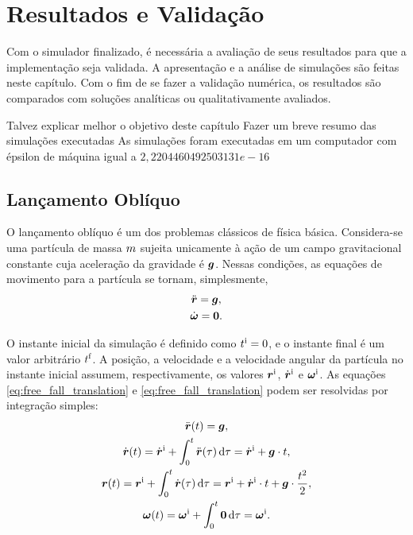 \chapter{Resultados e Validação} \label{ch:results}

Com o simulador finalizado, é necessária a avaliação de seus resultados para que a implementação seja validada. A apresentação e a análise de simulações são feitas neste capítulo. Com o fim de se fazer a validação numérica, os resultados são comparados com soluções analíticas ou qualitativamente avaliados.

\alert{Talvez explicar melhor o objetivo deste capítulo}
\alert{Fazer um breve resumo das simulações executadas}
\alert{As simulações foram executadas em um computador com épsilon de máquina igual a \(2,2204460492503131e-16\)}

\section{Lançamento Oblíquo}

O lançamento oblíquo é um dos problemas clássicos de física básica. Considera-se uma partícula de massa \(m\) sujeita unicamente à ação de um campo gravitacional constante cuja aceleração da gravidade é \(\bm{g}\). Nessas condições, as equações de movimento para a partícula se tornam, simplesmente,
\begin{gather}
	\acceleration = \gravity, \label{eq:free_fall_translation}\\
	\angularAcceleration = \nullVector \label{eq:free_fall_rotation}.
\end{gather}

O instante inicial da simulação é definido como \(t^{\text{i}}=0\), e o instante final é um valor arbitrário \(t^{\text{f}}\). A posição, a velocidade e a velocidade angular da partícula no instante inicial assumem, respectivamente, os valores \(\bm{r}^{\text{i}}\), \(\initial{\velocity}\) e \(\bm{\omega}^{\text{i}}\). As equações \eqref{eq:free_fall_translation} e \eqref{eq:free_fall_translation} podem ser resolvidas por integração simples:
\begin{gather*}
	\acceleration\pqty{t} = \gravity, \\
	\velocity\pqty{t} = \initial{\velocity} + \int_{0}^{t} \acceleration\pqty{\tau} \dd{\tau} = \initial{\velocity} + \gravity\cdot t, \\
	\position\pqty{t} = \initial{\position} + \int_{0}^{t} \velocity\pqty{\tau} \dd{\tau} = \initial{\position} + \initial{\velocity}\cdot t + \gravity\cdot \dfrac{t^2}{2}, \\
	\angularVelocity\pqty{t} = \initial{\angularVelocity} + \int_{0}^{t} \nullVector \dd{\tau} = \initial{\angularVelocity}.
\end{gather*}

